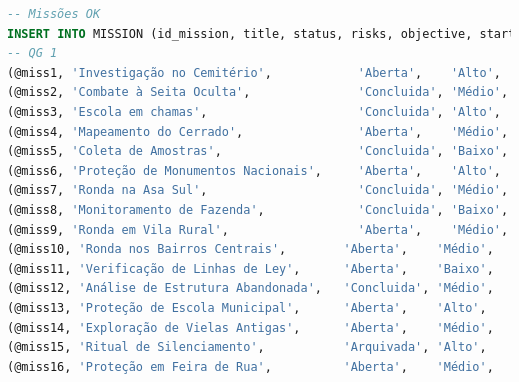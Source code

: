 \documentclass[12pt,a4paper]{report}
\begin{document}
\begin{lstlisting}[language=SQL, caption=population.sql]
-- Missões OK
INSERT INTO MISSION (id_mission, title, status, risks, objective, start_date, end_date, id_address, id_hq) VALUES
-- QG 1
(@miss1, 'Investigação no Cemitério',            'Aberta',    'Alto',   'Investigar aparições',           '2025-04-01 07:00:00', NULL,         @addr1,  @hq1),
(@miss2, 'Combate à Seita Oculta',               'Concluida', 'Médio',  'Desmantelar seita',              '2025-02-01 09:00:00', '2025-03-15', @addr2,  @hq1),
(@miss3, 'Escola em chamas',                     'Concluida', 'Alto', 'Identificar se houve presença paranormal', '2025-04-20 09:15:00', '2025-04-27', @addr99, @hq6),
(@miss4, 'Mapeamento do Cerrado',                'Aberta',    'Médio',  'Identificar hotspots energéticos','2025-05-20 09:15:00', NULL,         @addr20, @hq1),
(@miss5, 'Coleta de Amostras',                   'Concluida', 'Baixo',  'Recolher solo e fauna local',    '2025-02-25 06:00:00', '2025-02-27', @addr21, @hq1),
(@miss6, 'Proteção de Monumentos Nacionais',     'Aberta',    'Alto',   'Evitar vandalismo ectoplásmico', '2025-05-01 07:30:00', NULL,         @addr22, @hq1),
(@miss7, 'Ronda na Asa Sul',                     'Concluida', 'Médio',  'Monitorar entradas secundárias', '2025-03-15 14:00:00', '2025-03-16', @addr23, @hq1),
(@miss8, 'Monitoramento de Fazenda',             'Concluida', 'Baixo',  'Registrar atividade animal',     '2025-03-12 05:00:00', '2025-03-13', @addr34, @hq1),
(@miss9, 'Ronda em Vila Rural',                  'Aberta',    'Médio',  'Entrevistar moradores locais',   '2025-04-25 08:00:00', NULL,         @addr35, @hq1),
(@miss10, 'Ronda nos Bairros Centrais',        'Aberta',    'Médio',  'Observar padrões místicos',         '2025-05-21 20:00:00', NULL,         @addr40, @hq1),
(@miss11, 'Verificação de Linhas de Ley',      'Aberta',    'Baixo',  'Confirmar convergência energética', '2025-05-22 08:00:00', NULL,         @addr41, @hq1),
(@miss12, 'Análise de Estrutura Abandonada',   'Concluida', 'Médio',  'Inspecionar anomalias físicas',     '2025-04-10 14:00:00', '2025-04-11', @addr42, @hq1),
(@miss13, 'Proteção de Escola Municipal',      'Aberta',    'Alto',   'Evitar surtos espirituais',         '2025-05-25 07:00:00', NULL,         @addr43, @hq1),
(@miss14, 'Exploração de Vielas Antigas',      'Aberta',    'Médio',  'Registrar ocorrências místicas',    '2025-05-26 21:30:00', NULL,         @addr44, @hq1),
(@miss15, 'Ritual de Silenciamento',           'Arquivada', 'Alto',   'Conter entidade sonora',            '2025-04-02 01:00:00', '2025-04-03', @addr45, @hq1),
(@miss16, 'Proteção em Feira de Rua',          'Aberta',    'Médio',  'Evitar manipulação psíquica',       '2025-05-28 10:00:00', NULL,         @addr46, @hq1),

\end{lstlisting}
\end{document}

